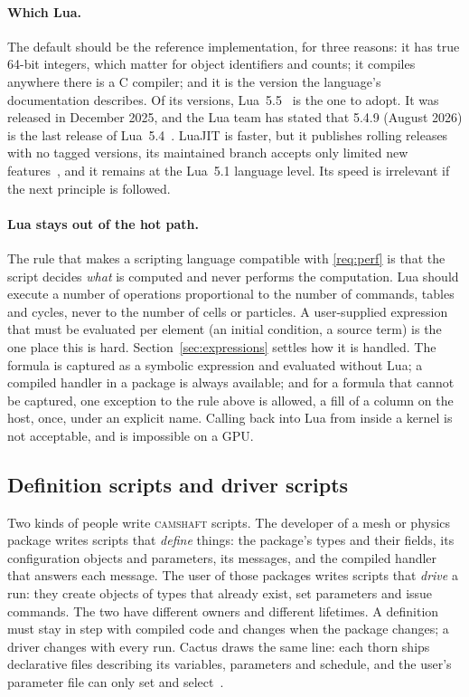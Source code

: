 \documentclass[11pt,a4paper]{article}
\newcommand{\camshaft}{\textsc{camshaft}}
\begin{document}
\paragraph{Which Lua.}  The default should be the reference implementation,
for three reasons: it has true 64-bit integers, which matter for object
identifiers and counts; it compiles anywhere there is a C compiler; and it is
the version the language's documentation describes.  Of its versions,
Lua~5.5~\cite{lua55} is the one to adopt.  It was released in December 2025,
and the Lua team has stated that 5.4.9 (August 2026) is the last release of
Lua~5.4~\cite{luaversions}.  LuaJIT is faster, but it publishes rolling
releases with no tagged versions, its maintained branch accepts only limited
new features~\cite{luajitstatus}, and it remains at the Lua~5.1 language
level.  Its speed is irrelevant if the next principle is followed.

\paragraph{Lua stays out of the hot path.}  The rule that makes a scripting
language compatible with \ref{req:perf} is that the script decides
\emph{what} is computed and never performs the computation.  Lua should
execute a number of operations proportional to the number of commands, tables
and cycles, never to the number of cells or particles.  A user-supplied
expression that must be evaluated per element (an initial condition, a source
term) is the one place this is hard.  Section~\ref{sec:expressions} settles
how it is handled.  The formula is captured as a symbolic expression and
evaluated without Lua; a compiled handler in a package is always available;
and for a formula that cannot be captured, one exception to the rule above is
allowed, a fill of a column on the host, once, under an explicit name.
Calling back into Lua from inside a kernel is not acceptable, and is
impossible on a GPU.

\subsection{Definition scripts and driver scripts}
\label{sec:scripts}

Two kinds of people write \camshaft{} scripts.  The developer of a mesh or
physics package writes scripts that \emph{define} things: the package's types
and their fields, its configuration objects and parameters, its messages, and
the compiled handler that answers each message.  The user of those packages
writes scripts that \emph{drive} a run: they create objects of types that
already exist, set parameters and issue commands.  The two have different
owners and different lifetimes.  A definition must stay in step with compiled
code and changes when the package changes; a driver changes with every run.
Cactus draws the same line: each thorn ships declarative files describing
its variables, parameters and schedule, and the user's parameter file can
only set and select~\cite{cactus}.
\end{document}
